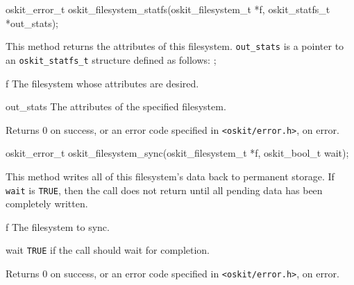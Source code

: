 \begin{apisyn}

	\funcproto oskit_error_t
	oskit_filesystem_statfs(oskit_filesystem_t *f, 
			       \outparam oskit_statfs_t *out_stats);
\end{apisyn}
\ostofs
\begin{apidesc}
	This method returns the attributes of this filesystem.
	{\tt out_stats} is a pointer to an {\tt oskit_statfs_t} structure 
	defined	as follows:
	;
\end{apidesc}
\begin{apiparm}
	\item[f]
		The filesystem whose attributes are desired.
	\item[out_stats]
		The attributes of the specified filesystem.
\end{apiparm}
\begin{apiret}
	Returns 0 on success, or an error code specified in
	{\tt <oskit/error.h>}, on error.
\end{apiret}


\begin{apisyn}

	\funcproto oskit_error_t
	oskit_filesystem_sync(oskit_filesystem_t *f, 
			      oskit_bool_t wait); 	
\end{apisyn}
\ostofs
\begin{apidesc}
	This method writes all of this filesystem's data back to permanent
	storage.  If {\tt wait} is {\tt TRUE}, then the call does not return
	until all pending data has been completely written.

\end{apidesc}
\begin{apiparm}
	\item[f]
		The filesystem to sync.
	\item[wait]
		{\tt TRUE} if the call should wait for completion.
\end{apiparm}
\begin{apiret}
	Returns 0 on success, or an error code specified in
	{\tt <oskit/error.h>}, on error.
\end{apiret}


